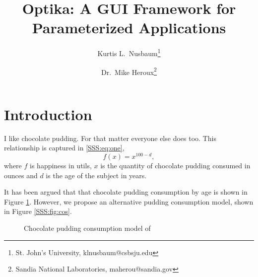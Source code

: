 \documentclass{csri10}
\title{Optika: A GUI Framework for Parameterized Applications}
\author{Kurtis L.\ Nusbaum\thanks{St. John's University, klnusbaum@csbsju.edu} \and Dr.\ Mike Heroux\thanks{Sandia National Laboratories,
maherou@sandia.gov}}
\begin{document}
\maketitle

\begin{abstract}

\end{abstract}

\section{Introduction} \label{SSS:sec:intro}
I like chocolate pudding.  For that matter everyone else does too. This relationship is captured in \eqref{SSS:eq:one},
\begin{equation}\label{SSS:eq:one}
f(x) = x^{100-d},
\end{equation}
where $f$ is happiness in utils, $x$ is the quantity of chocolate pudding consumed in ounces and $d$ is the age of the
subject in years.

It has been argued that that chocolate pudding consumption by age is shown in Figure \ref{SSS:fig:Mentor05}.  However,
we propose an alternative pudding consumption model, shown in Figure \ref{SSS:fig:cos}.

\begin{figure}[hbh]
\begin{center}
 \caption{Chocolate pudding consumption model of
\cite{SSS:Mentor05}}\label{SSS:fig:Mentor05}
\end{center}\end{figure}
\end{document}
